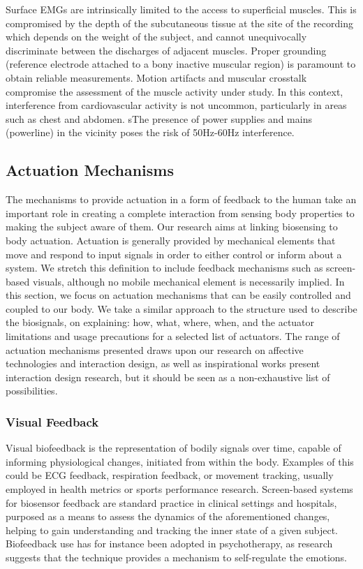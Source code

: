 Surface EMGs are intrinsically limited to the access to superficial muscles. This is compromised by the depth of the subcutaneous tissue at the site of the recording which depends on the weight of the subject, and cannot unequivocally discriminate between the discharges of adjacent muscles.
Proper grounding (reference electrode attached to a bony inactive muscular region) is paramount to obtain reliable measurements. Motion artifacts and muscular crosstalk compromise the assessment of the muscle activity under study. In this context, interference from cardiovascular activity is not uncommon, particularly in areas such as chest and abdomen. sThe presence of power supplies and mains (powerline) in the vicinity poses the risk of 50Hz-60Hz interference.

\subsection{Actuation Mechanisms} 

The mechanisms to provide actuation in a form of feedback to the human take an important role in creating a complete interaction from sensing body properties to making the subject aware of them. Our research aims at linking biosensing to body actuation. Actuation is generally provided by mechanical elements that move and respond to input signals in order to either control or inform about a system. We stretch this definition to include feedback mechanisms such as screen-based visuals, although no mobile mechanical element is necessarily implied. In this section, we focus on actuation mechanisms that can be easily controlled and coupled to our body. We take a similar approach to the structure used to describe the biosignals, on explaining: how, what, where, when, and the actuator limitations and usage precautions for a selected list of actuators. The range of actuation mechanisms presented draws upon our research on affective technologies and interaction design, as well as inspirational works present interaction design research, but it should be seen as a non-exhaustive list of possibilities.

\subsubsection{Visual Feedback}

Visual biofeedback is the representation of bodily signals over time, capable of informing physiological changes, initiated from within the body. Examples of this could be ECG feedback, respiration feedback, or movement tracking, usually employed in health metrics or sports performance research. Screen-based systems for biosensor feedback are standard practice in clinical settings and hospitals, purposed as a means to assess the dynamics of the aforementioned changes, helping to gain understanding and tracking the inner state of a given subject. Biofeedback use has for instance been adopted in psychotherapy, as research suggests that the technique provides a mechanism to self-regulate the emotions. 

